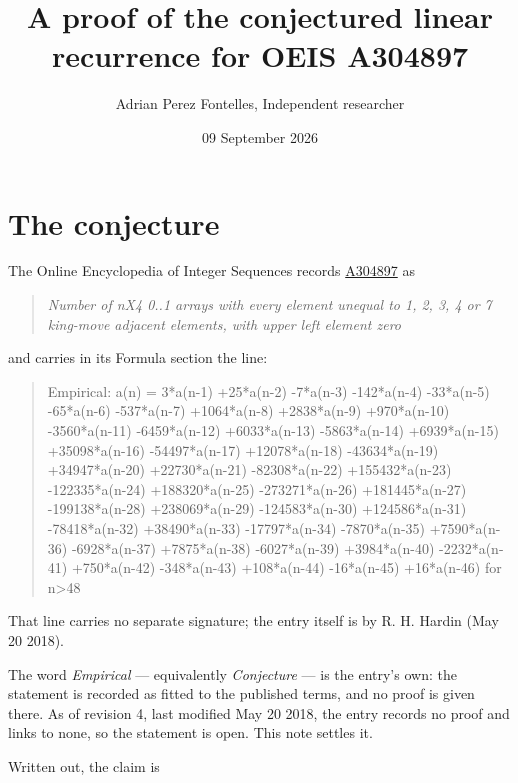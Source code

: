 \documentclass[11pt]{article}
\title{A proof of the conjectured linear recurrence for OEIS A304897}
\author{Adrian Perez Fontelles, Independent researcher}
\date{09 September 2026}
\theoremstyle{definition}
\begin{document}
\maketitle
\section{The conjecture}

The Online Encyclopedia of Integer Sequences records \href{https://oeis.org/A304897}{A304897} as

\begin{quote}\itshape Number of nX4 0..1 arrays with every element unequal to 1, 2, 3, 4 or 7 king-move adjacent elements, with upper left element zero\end{quote}

and carries in its Formula section the line:

\begin{quote}\ttfamily Empirical: a(n) = 3*a(n-1) +25*a(n-2) -7*a(n-3) -142*a(n-4) -33*a(n-5) -65*a(n-6) -537*a(n-7) +1064*a(n-8) +2838*a(n-9) +970*a(n-10) -3560*a(n-11) -6459*a(n-12) +6033*a(n-13) -5863*a(n-14) +6939*a(n-15) +35098*a(n-16) -54497*a(n-17) +12078*a(n-18) -43634*a(n-19) +34947*a(n-20) +22730*a(n-21) -82308*a(n-22) +155432*a(n-23) -122335*a(n-24) +188320*a(n-25) -273271*a(n-26) +181445*a(n-27) -199138*a(n-28) +238069*a(n-29) -124583*a(n-30) +124586*a(n-31) -78418*a(n-32) +38490*a(n-33) -17797*a(n-34) -7870*a(n-35) +7590*a(n-36) -6928*a(n-37) +7875*a(n-38) -6027*a(n-39) +3984*a(n-40) -2232*a(n-41) +750*a(n-42) -348*a(n-43) +108*a(n-44) -16*a(n-45) +16*a(n-46) for n>48\end{quote}

That line carries no separate signature; the entry itself is by R. H. Hardin (May 20 2018).

The word {\itshape Empirical} --- equivalently {\itshape Conjecture} --- is the entry's own: the statement is recorded as fitted to the published terms, and no proof is given there. As of revision 4, last modified May 20 2018, the entry records no proof and links to none, so the statement is open. This note settles it.

Written out, the claim is
\end{document}
